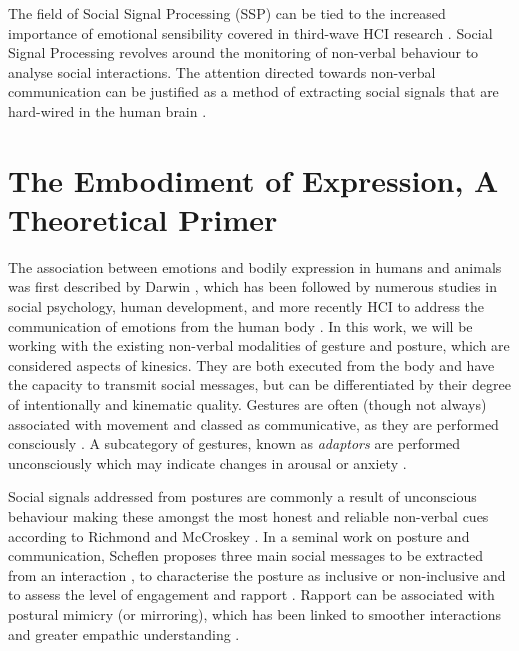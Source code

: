 The field of Social Signal Processing (SSP) can be tied to the increased importance of emotional sensibility covered in third-wave HCI research \cite{cristescu_emotions_2008}. Social Signal Processing revolves around the monitoring of non-verbal behaviour to analyse social interactions. The attention directed towards non-verbal communication can be justified as a method of extracting social signals that are hard-wired in the human brain \cite{vinciarelli_social_2009-1}.

\section{The Embodiment of Expression, A Theoretical Primer}
\label{background:ebodiment_emotions}

The association between emotions and bodily expression in humans and animals was first described by Darwin \cite{darwin_expression_2013}, which has been followed by numerous studies in social psychology, human development, and more recently HCI \cite{alaoui_movement_2012, gillies_creating_2018, fdili_alaoui_strategies_2015} to address the communication of emotions from the human body \cite{gunes_lab_2008}. In this work, we will be working with the existing non-verbal modalities of gesture and posture, which are considered aspects of kinesics. They are both executed from the body and have the capacity to transmit social messages, but can be differentiated by their degree of intentionally and kinematic quality. Gestures are often (though not always) associated with movement and classed as communicative, as they are performed consciously \cite{vinciarelli_towards_2011}. A subcategory of gestures, known as \textit{adaptors} are performed unconsciously which may indicate changes in arousal or anxiety \cite{hans_kinesics_2015, neff_dont_2011}.

Social signals addressed from postures are commonly a result of unconscious behaviour making these amongst the most honest and reliable non-verbal cues according to Richmond and McCroskey \cite{richmond_nonverbal_2011}. In a seminal work on posture and communication, Scheflen proposes three main social messages to be extracted from an interaction \cite{scheflen_significance_1964}, to characterise the posture as inclusive or non-inclusive and to assess the level of engagement and rapport \cite{vinciarelli_social_2009}. Rapport can be associated with postural mimicry (or mirroring), which has been linked to smoother interactions and greater empathic understanding \cite{chartrand_chameleon_1999}.

